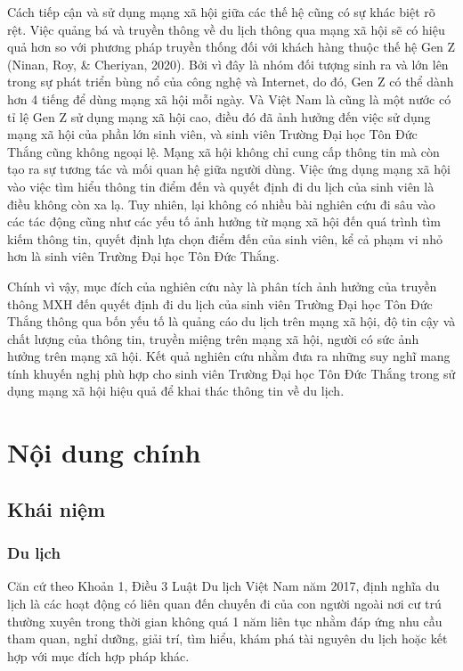 Cách tiếp cận và sử dụng mạng xã hội giữa các thế hệ cũng có sự khác biệt rõ rệt. Việc quảng bá và truyền thông về du lịch thông qua mạng xã hội sẽ có hiệu quả hơn so với phương pháp truyền thống đối với khách hàng thuộc thế hệ Gen Z (Ninan, Roy, \& Cheriyan, 2020). Bởi vì đây là nhóm đối tượng sinh ra và lớn lên trong sự phát triển bùng nổ của công nghệ và Internet, do đó, Gen Z có thể dành hơn 4 tiếng để dùng mạng xã hội mỗi ngày. Và Việt Nam là cũng là một nước có tỉ lệ Gen Z sử dụng mạng xã hội cao, điều đó đã ảnh hưởng đến việc sử dụng mạng xã hội của phần lớn sinh viên, và sinh viên Trường Đại học Tôn Đức Thắng cũng không ngoại lệ. Mạng xã hội không chỉ cung cấp thông tin mà còn tạo ra sự tương tác và mối quan hệ giữa người dùng. Việc ứng dụng mạng xã hội vào việc tìm hiểu thông tin điểm đến và quyết định đi du lịch của sinh viên là điều không còn xa lạ. Tuy nhiên, lại không có nhiều bài nghiên cứu đi sâu vào các tác động cũng như các yếu tố ảnh hưởng từ mạng xã hội đến quá trình tìm kiếm thông tin, quyết định lựa chọn điểm đến của sinh viên, kể cả phạm vi nhỏ hơn là sinh viên Trường Đại học Tôn Đức Thắng.

Chính vì vậy, mục đích của nghiên cứu này là phân tích ảnh hưởng của truyền thông MXH đến quyết định đi du lịch của sinh viên Trường Đại học Tôn Đức Thắng thông qua bốn yếu tố là quảng cáo du lịch trên mạng xã hội, độ tin cậy và chất lượng của thông tin, truyền miệng trên mạng xã hội, người có sức ảnh hưởng trên mạng xã hội. Kết quả nghiên cứu nhằm đưa ra những suy nghĩ mang tính khuyến nghị phù hợp cho sinh viên Trường Đại học Tôn Đức Thắng trong sử dụng mạng xã hội hiệu quả để khai thác thông tin về du lịch. 

\section{Nội dung chính}
	\subsection{Khái niệm}
		\subsubsection{Du lịch}
		
		Căn cứ theo Khoản 1, Điều 3 Luật Du lịch Việt Nam năm 2017, định nghĩa du lịch là các hoạt động có liên quan đến chuyến đi của con người ngoài nơi cư trú thường xuyên trong thời gian không quá 1 năm liên tục nhằm đáp ứng nhu cầu tham quan, nghỉ dưỡng, giải trí, tìm hiểu, khám phá tài nguyên du lịch hoặc kết hợp với mục đích hợp pháp khác.
		
